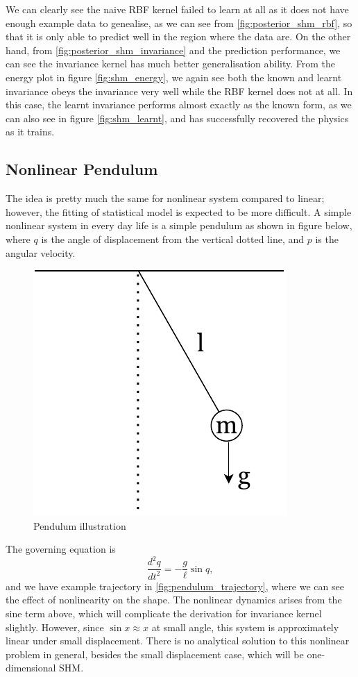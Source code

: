 \documentclass{statsmsc}
\begin{document}
We can clearly see the naive RBF kernel failed to learn at all as it does not have enough example data to genealise, as we can see from \ref{fig:posterior_shm_rbf}, so that it is only able to predict well in the region where the data are. 
On the other hand, from \ref{fig:posterior_shm_invariance} and the prediction performance, we can see the invariance kernel has much better generalisation ability.
From the energy plot in figure \ref{fig:shm_energy}, we again see both the known and learnt invariance obeys the invariance very well while the RBF kernel does not at all.
In this case, the learnt invariance performs almost exactly as the known form, as we can also see in figure \ref{fig:shm_learnt}, and has successfully recovered the physics as it trains. 


\subsection{Nonlinear Pendulum}
The idea is pretty much the same for nonlinear system compared to linear; however, the fitting of statistical model is expected to be more difficult.
A simple nonlinear system in every day life is a simple pendulum as shown in figure below, where $q$ is the angle of displacement from the vertical dotted line, and $p$ is the angular velocity.

\begin{figure}[H]
        \centering
        \includegraphics[width=0.3\linewidth]{../figures/pendulum.pdf}
        \caption{Pendulum illustration}
        \label{fig:pendulum_diagram}
\end{figure}

The governing equation is 
$$
\frac{d^2q}{dt^2}=-\frac{g}{\ell}\sin q, 
$$
and we have example trajectory in \ref{fig:pendulum_trajectory}, where we can see the effect of nonlinearity on the shape. 
The nonlinear dynamics arises from the sine term above, which will complicate the derivation for invariance kernel slightly. 
However, since $\sin x \approx x$ at small angle, this system is approximately linear under small displacement. 
There is no analytical solution to this nonlinear problem in general, besides the small displacement case, which will be one-dimensional SHM.
\end{document}
